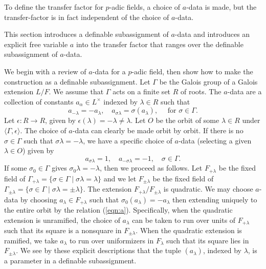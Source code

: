 To define the transfer factor for $p$-adic fields, a choice of
$a$-data is made, but the transfer-factor is in fact independent of
the choice of $a$-data.

This section introduces a definable subassignment of $a$-data and
introduces an explicit free variable $a$ into the transfer factor that
ranges over the definable subassignment of $a$-data.  %

We begin with a review of $a$-data for a $p$-adic field, then show how
to make the construction as a definable subassignment.  Let $\Gamma$
be the Galois group of a Galois extension $L/F$.  We assume that
$\Gamma$ acts on a finite set $R$ of roots.  The $a$-data are a
collection of constants $a_\alpha\in L^\times$ indexed by $\lambda\in
R$ such that
\begin{equation}\label{eqn:a}
a_{-\lambda} = -a_\lambda,\quad a_{\sigma\lambda} 
= \sigma(a_\lambda),\quad \text{ for } \sigma\in \Gamma.
\end{equation}
Let $\epsilon:R\to R$, given by
$\epsilon(\lambda)=-\lambda\ne\lambda$.  Let $O$ be the orbit of some
$\lambda\in R$ under $\langle\Gamma,\epsilon\rangle$.  The choice of
$a$-data can clearly be made orbit by orbit.  If there is no
$\sigma\in \Gamma$ such that $\sigma\lambda=-\lambda$, we have a
specific choice of $a$-data (selecting a given $\lambda\in O$) given
by
\[
a_{\sigma\lambda}=1,
\quad a_{-\sigma\lambda}=-1,\quad \sigma\in\Gamma.
\]
If some $\sigma_0\in\Gamma$ gives $\sigma_0\lambda=-\lambda$, then we
proceed as follows. Let $F_{+\lambda}$ be the fixed field of
$\Gamma_{+\lambda} = \{\sigma\in\Gamma\mid \sigma\lambda=\lambda\}$
and we let $F_{\pm\lambda}$ be the fixed field of
$\Gamma_{\pm\lambda} = \{\sigma\in\Gamma\mid
\sigma\lambda=\pm\lambda\}$.
The extension $F_{+\lambda}/F_{\pm\lambda}$ is quadratic.  We may
choose $a$-data by choosing $a_\lambda\in F_{+\lambda}$ such that
$\sigma_0(a_\lambda) = -a_\lambda$ then extending uniquely to the
entire orbit by the relation (\ref{eqn:a}).  Specifically, when the
quadratic extension is unramified, the choice of $a_\lambda$ can be
taken to run over units of $F_{+\lambda}$ such that its square is a
nonsquare in $F_{\pm\lambda}$.  When the quadratic extension is
ramified, we take $a_\lambda$ to run over uniformizers in
$F_{\lambda}$ such that its square lies in $F_{\pm\lambda}$.  We see
by these explicit descriptions that the tuple $(a_\lambda)$, indexed
by $\lambda$,  is a parameter in a
definable subassignment.

